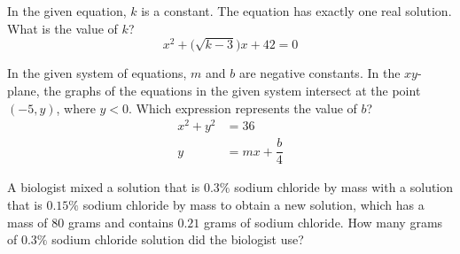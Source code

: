 \noindent\markforreview
\vspace{1em}

In the given equation, \(k\) is a constant. The equation has exactly one real solution. What is the value of \(k\)?
\[
x^{2} + \bigl(\sqrt{k - 3}\bigr)x + 42 = 0
\]

\vspace{0.75em}


\vspace{2em}
\newpage

\noindent\markforreview
\vspace{1em}

In the given system of equations, \(m\) and \(b\) are negative constants. In the \(xy\)-plane, the graphs of the equations in the given system intersect at the point \((-5, y)\), where \(y < 0\). Which expression represents the value of \(b\)?
\[
\begin{aligned}
x^{2} + y^{2} &= 36 \\
y &= mx + \dfrac{b}{4}
\end{aligned}
\]

\vspace{0.75em}


\vspace{2em}
\newpage

\noindent\markforreview
\vspace{1em}

A biologist mixed a solution that is \(0.3\%\) sodium chloride by mass with a solution that is \(0.15\%\) sodium chloride by mass to obtain a new solution, which has a mass of \(80\) grams and contains \(0.21\) grams of sodium chloride. How many grams of \(0.3\%\) sodium chloride solution did the biologist use?

\vspace{0.75em}


\vspace{2em}
\newpage

\noindent\markforreview
\vspace{1em}


